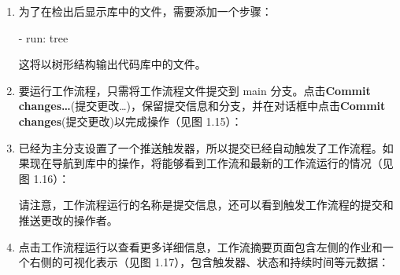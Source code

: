 \begin{enumerate}
在工作流编辑器的右侧是市场，可以直接在那里搜索 Action。搜索检出（checkout）并找到来自 actions 的 Action（这些是 GitHub 的内置 Action）。列表包含一个安装部分，可以将其复制到工作流中以使用该 Action（见图 1.14）：


请注意，许多参数是可选的。为了checkout代码库，只需要以下几行信息即可：

\begin{shell}
- name: Checkout
  uses: actions/checkout@v4.1.0
\end{shell}

\begin{myNotic}{使用GitHub Actions}
指向 GitHub 上的一个位置。语法是 \{path\}@\{ref\}。路径指向 GitHub 上的物理位置，如果 Actions 在代码仓库的根目录中，则为 \{owner\}/\{repo\}，如果 Actions 在子文件夹中，则为 \{owner\}/\{repo\}/\{path\}。@\{ref\} 之后的引用指向提交的 git 引用，可以是一个标签、分支或单个提交 SHA 码。
\end{myNotic}

\item 
为了在检出后显示库中的文件，需要添加一个步骤：

\begin{shell}
- run: tree
\end{shell}

这将以树形结构输出代码库中的文件。

\item 
要运行工作流程，只需将工作流程文件提交到 main 分支。点击\textbf{Commit changes…}(提交更改…)，保留提交信息和分支，并在对话框中点击\textbf{Commit changes}(提交更改)以完成操作（见图 1.15）：


\item 
已经为主分支设置了一个推送触发器，所以提交已经自动触发了工作流程。如果现在导航到库中的操作，将能够看到工作流和最新的工作流运行的情况（见图 1.16）：


请注意，工作流程运行的名称是提交信息，还可以看到触发工作流程的提交和推送更改的操作者。

\item 
点击工作流程运行以查看更多详细信息，工作流摘要页面包含左侧的作业和一个右侧的可视化表示（见图 1.17），包含触发器、状态和持续时间等元数据：


\end{enumerate}
